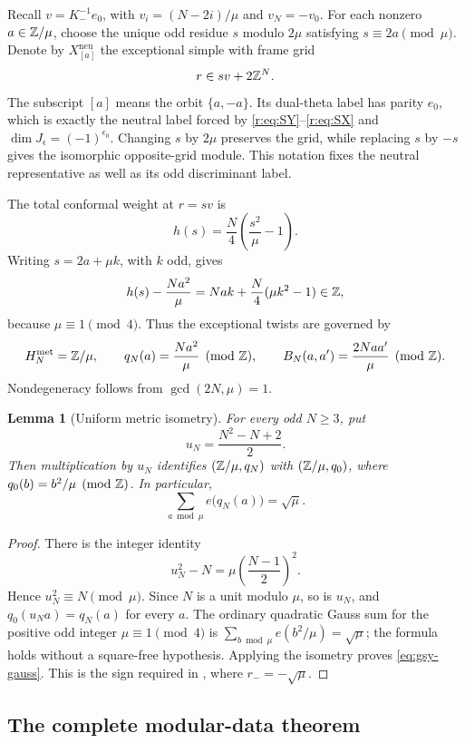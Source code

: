 \documentclass[11pt,a4paper]{article}
\numberwithin{equation}{section}
\newtheorem{lemma}[theorem]{Lemma}
\theoremstyle{definition}\newtheorem{definition}[theorem]{Definition}
\theoremstyle{remark}\newtheorem{remark}[theorem]{Remark}
\begin{document}
Recall $v=K_-^{-1}e_0$, with $v_i=(N-2i)/\mu$ and $v_N=-v_0$.
For each nonzero $a\in\mathbb Z/\mu$, choose the unique odd residue $s$
modulo $2\mu$ satisfying $s\equiv2a\pmod\mu$. Denote by
$X^{\mathrm{neu}}_{[a]}$ the exceptional simple with frame grid
\[
                  r\in sv+2\mathbb Z^N.
\]
The subscript $[a]$ means the orbit $\{a,-a\}$. Its dual-theta
label has parity $e_0$, which is exactly the neutral label forced by
\eqref{r:eq:SY}--\eqref{r:eq:SX} and $\dim J_\epsilon=(-1)^{\epsilon_0}$.
Changing $s$ by $2\mu$ preserves the grid, while replacing $s$ by
$-s$ gives the isomorphic opposite-grid module. This notation fixes
the neutral representative as well as its odd discriminant label.

The total conformal weight at $r=sv$ is
\[
             h(s)=\frac N4\left(\frac{s^2}{\mu}-1\right).
\]
Writing $s=2a+\mu k$, with $k$ odd, gives
\[
 h(s)-\frac{Na^2}{\mu}
       =Nak+\frac N4(\mu k^2-1)\in\mathbb Z,
\]
because $\mu\equiv1\pmod4$. Thus the exceptional twists are governed by
\begin{equation}\label{eq:gsy-natural-form}
 H_N^{\mathrm{met}}=\mathbb Z/\mu,\qquad
 q_N(a)=\frac{Na^2}{\mu}\pmod{\mathbb Z},\qquad
 B_N(a,a')=\frac{2Naa'}{\mu}\pmod{\mathbb Z}.
\end{equation}
Nondegeneracy follows from $\gcd(2N,\mu)=1$.

\begin{lemma}[Uniform metric isometry]\label{lem:gsy-isometry}
For every odd $N\geq3$, put
\[
 u_N=\frac{N^2-N+2}{2}.
\]
Then multiplication by $u_N$ identifies
$(\mathbb Z/\mu,q_N)$ with $(\mathbb Z/\mu,q_0)$, where
$q_0(b)=b^2/\mu\pmod{\mathbb Z}$. In particular,
\begin{equation}\label{eq:gsy-gauss}
 \sum_{a\bmod\mu}e\bigl(q_N(a)\bigr)=\sqrt\mu.
\end{equation}
\end{lemma}
\begin{proof}
There is the integer identity
\[
 u_N^2-N=\mu\left(\frac{N-1}{2}\right)^2.
\]
Hence $u_N^2\equiv N\pmod\mu$. Since $N$ is a unit modulo $\mu$,
so is $u_N$, and $q_0(u_Na)=q_N(a)$ for every $a$.
The ordinary quadratic Gauss sum for the positive odd integer
$\mu\equiv1\pmod4$ is
$\sum_{b\bmod\mu}e(b^2/\mu)=\sqrt\mu$; the formula holds without
a square-free hypothesis. Applying the isometry proves
\eqref{eq:gsy-gauss}. This is the sign required in
\cite[Theorem 5.1]{gsy}, where $r_-=-\sqrt\mu$.
\end{proof}

\subsection{The complete modular-data theorem}
\end{document}
